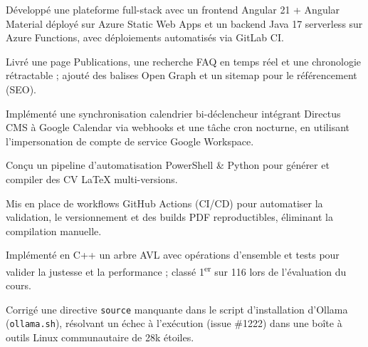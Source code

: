 \documentclass[letterpaper,10pt]{article}
\begin{document}
\begin{resume_list}
\item Développé une plateforme full-stack avec un frontend Angular 21 + Angular Material déployé sur Azure Static Web Apps et un backend Java 17 serverless sur Azure Functions, avec déploiements automatisés via GitLab CI.
\item Livré une page Publications, une recherche FAQ en temps réel et une chronologie rétractable ; ajouté des balises Open Graph et un sitemap pour le référencement (SEO).
\item Implémenté une synchronisation calendrier bi-déclencheur intégrant Directus CMS à Google Calendar via webhooks et une tâche cron nocturne, en utilisant l'impersonation de compte de service Google Workspace.
\end{resume_list}

\begin{resume_list}
\item Conçu un pipeline d'automatisation PowerShell \& Python pour générer et compiler des CV LaTeX multi-versions.
\item Mis en place de workflows GitHub Actions (CI/CD) pour automatiser la validation, le versionnement et des builds PDF reproductibles, éliminant la compilation manuelle.
\end{resume_list}

\begin{resume_list}
\item Implémenté en C++ un arbre AVL avec opérations d'ensemble et tests pour valider la justesse et la performance ; classé 1\textsuperscript{er} sur 116 lors de l'évaluation du cours.
\end{resume_list}

\begin{resume_list}
\item Corrigé une directive \texttt{source} manquante dans le script d'installation d'Ollama (\texttt{ollama.sh}), résolvant un échec à l'exécution (issue \#1222) dans une boîte à outils Linux communautaire de 28k étoiles.
\end{resume_list}
\end{document}
